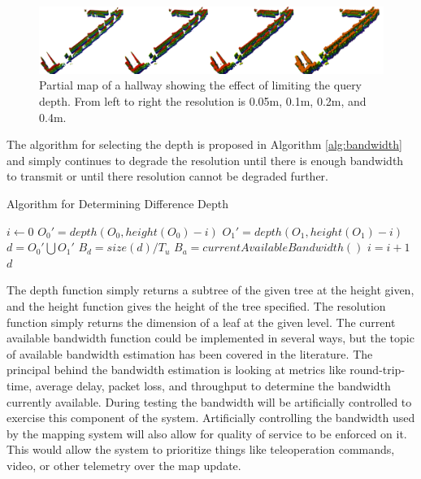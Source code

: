 \documentclass[12pt]{report}
\begin{document}
\begin{figure}[ht]
  \centering
  \includegraphics[width=6.5in,keepaspectratio]{ShelbySE_2f_combined_octovis.png}
  \caption{Partial map of a hallway showing the effect of limiting the query 
           depth.  From left to right the resolution is 0.05m, 0.1m, 0.2m,
           and 0.4m.}
  \label{fig:treedepth}
\end{figure}

The algorithm for selecting the depth is proposed in Algorithm \ref{alg:bandwidth} and simply continues to degrade the resolution until there is enough bandwidth to transmit or until there resolution cannot be degraded further.

\begin{algorithm}
\caption{Algorithm for Determining Difference Depth}
\label{alg:bandwidth}
\begin{algorithmic}
  \STATE {}
  \STATE {}
  \STATE {}
  \STATE {}
  \STATE {}
  \STATE {}
  \STATE {}
  \STATE $i\gets 0$
  \REPEAT
    \STATE $O_0 \prime = depth(O_0,height(O_0)-i)$
    \STATE $O_1 \prime = depth(O_1,height(O_1)-i)$
    \STATE $d = O_0 \prime \bigcup O_1 \prime $
    \STATE $B_d = size(d) / T_u$
    \STATE $B_a = currentAvailableBandwidth()$
    \STATE $i = i + 1$
  \RETURN $d$
\end{algorithmic}
\end{algorithm}

The depth function simply returns a subtree of the given tree at the height given, and the height function gives the height of the tree specified.  The resolution function simply returns the dimension of a leaf at the given level.  The current available bandwidth function could be implemented in several ways, but the topic of available bandwidth estimation has been covered in the literature.\cite{prasad2003bandwidth} The principal behind the bandwidth estimation is looking at metrics like round-trip-time, average delay, packet loss, and throughput to determine the bandwidth currently available.  During testing the bandwidth will be artificially controlled to exercise this component of the system.  Artificially controlling the bandwidth used by the mapping system will also allow for quality of service to be enforced on it.  This would allow the system to prioritize things like teleoperation commands, video, or other telemetry over the map update.
\end{document}
